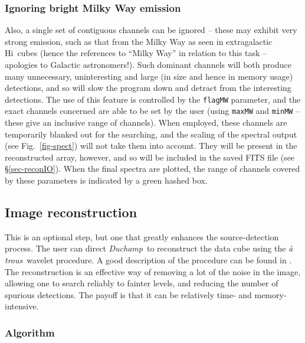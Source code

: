 \documentclass[12pt,a4paper]{article}
\newcommand{\hi}{H{\sc i}}
\newcommand{\duchamp}{\emph{Duchamp}}
\newcommand{\atrous}{\textit{{\`a} trous}}
\begin{document}
\subsubsection{Ignoring bright Milky Way emission}

Also, a single set of contiguous channels can be ignored -- these may
exhibit very strong emission, such as that from the Milky Way as seen
in extragalactic \hi\ cubes (hence the references to ``Milky Way'' in
relation to this task -- apologies to Galactic astronomers!). Such
dominant channels will both produce many unnecessary, uninteresting
and large (in size and hence in memory usage) detections, and so will
slow the program down and detract from the interesting detections. The
use of this feature is controlled by the \texttt{flagMW} parameter, and
the exact channels concerned are able to be set by the user (using
\texttt{maxMW} and \texttt{minMW} -- these give an inclusive range of
channels). When employed, these channels are temporarily blanked out
for the searching, and the scaling of the spectral output (see
Fig.~\ref{fig-spect}) will not take them into account. They will be
present in the reconstructed array, however, and so will be included
in the saved FITS file (see \S\ref{sec-reconIO}). When the final
spectra are plotted, the range of channels covered by these parameters
is indicated by a green hashed box.

\subsection{Image reconstruction}
\label{sec-recon}

This is an optional step, but one that greatly enhances the
source-detection process. The user can direct \duchamp\ to reconstruct
the data cube using the \atrous\ wavelet procedure. A good
description of the procedure can be found in
\citet{starck02:book}. The reconstruction is an effective way of
removing a lot of the noise in the image, allowing one to search
reliably to fainter levels, and reducing the number of spurious
detections. The payoff is that it can be relatively time- and
memory-intensive. 

\subsubsection{Algorithm}
\end{document}
